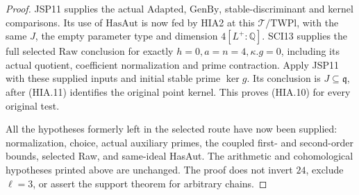 \begin{proof}
JSP11 supplies the actual \(\mathrm{Adapted}\),
\(\mathrm{GenBy}\), stable-discriminant and kernel
comparisons.  Its use of \(\mathrm{HasAut}\) is now
fed by HIA2 at this \(\mathcal T/\mathrm{TWPl}\), with
the same \(J\), the empty parameter type and
dimension \(4[L^+:\mathbb Q]\).  SCI13 supplies the
full selected \(\mathrm{Raw}\) conclusion for exactly
\(h=0,a=n=4,\kappa.g=0\), including its actual
quotient, coefficient normalization and prime contraction.
Apply JSP11 with these supplied inputs and initial stable
prime \(\ker g\).  Its conclusion is
\(J\subseteq\mathfrak q\), after (HIA.11) identifies
the original point kernel.  This proves (HIA.10) for
every original test.

All the hypotheses formerly left in the selected route
have now been supplied: normalization, choice, actual
auxiliary primes, the coupled first- and second-order
bounds, selected Raw, and same-ideal HasAut.  The arithmetic
and cohomological hypotheses printed above are unchanged.
The proof does not invert \(24\), exclude \(\ell=3\),
or assert the support theorem for arbitrary chains.
\end{proof}

